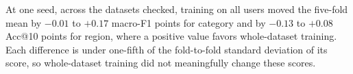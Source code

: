 
At one seed, across the datasets checked, training on all users moved the five-fold mean by
$-0.01$ to $+0.17$ macro-F1 points for category and by $-0.13$ to $+0.08$ Acc@10 points for
region, where a positive value favors whole-dataset training. Each difference is under one-fifth
of the fold-to-fold standard deviation of its score, so whole-dataset training did not
meaningfully change these scores.

